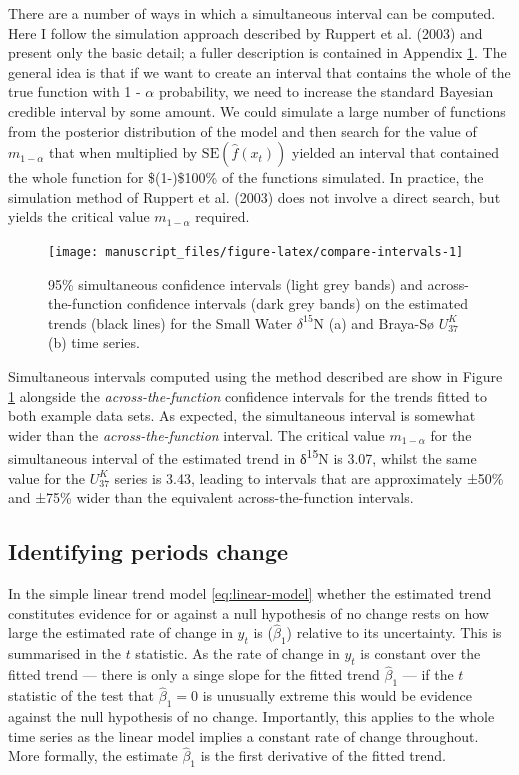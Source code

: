 \documentclass[12pt,]{article}
\newcommand{\uk}{\ensuremath{\mathit{U}^{\mathit{K}}_{\mathup{37}}}}
\begin{document}
There are a number of ways in which a simultaneous interval can be
computed. Here I follow the simulation approach described by Ruppert et
al. (2003) and present only the basic detail; a fuller description is
contained in Appendix \protect\hyperlink{appendix}{1}. The general idea
is that if we want to create an interval that contains the whole of the
true function with 1 - \(\alpha\) probability, we need to increase the
standard Bayesian credible interval by some amount. We could simulate a
large number of functions from the posterior distribution of the model
and then search for the value of \(m_{1-\alpha}\) that when multiplied
by \(\text{SE}(\hat{f}(x_t))\) yielded an interval that contained the
whole function for \$(1-\alpha)\$100\% of the functions simulated. In
practice, the simulation method of Ruppert et al. (2003) does not
involve a direct search, but yields the critical value \(m_{1-\alpha}\)
required.

\begin{figure}

{\centering \texttt{[image: manuscript\_files/figure-latex/compare-intervals-1]} 

}

\caption{95\% simultaneous confidence intervals (light grey bands) and across-the-function confidence intervals (dark grey bands) on the estimated trends (black lines) for the Small Water $\delta^{15}\text{N}$ (a) and Braya-Sø \uk{} (b) time series.}\label{fig:compare-intervals}
\end{figure}

Simultaneous intervals computed using the method described are show in
Figure \ref{fig:compare-intervals} alongside the
\emph{across-the-function} confidence intervals for the trends fitted to
both example data sets. As expected, the simultaneous interval is
somewhat wider than the \emph{across-the-function} interval. The
critical value \(m_{1-\alpha}\) for the simultaneous interval of the
estimated trend in δ\textsuperscript{15}N is 3.07, whilst the same value
for the \uk{} series is 3.43, leading to intervals that are
approximately ±50\% and ±75\% wider than the equivalent
across-the-function intervals.

\subsection{Identifying periods
change}\label{identifying-periods-change}

In the simple linear trend model \eqref{eq:linear-model} whether the
estimated trend constitutes evidence for or against a null hypothesis of
no change rests on how large the estimated rate of change in \(y_t\) is
(\(\hat{\beta}_1\)) relative to its uncertainty. This is summarised in
the \(t\) statistic. As the rate of change in \(y_t\) is constant over
the fitted trend --- there is only a singe slope for the fitted trend
\(\hat{\beta}_1\) --- if the \(t\) statistic of the test that
\(\hat{\beta}_1 = 0\) is unusually extreme this would be evidence
against the null hypothesis of no change. Importantly, this applies to
the whole time series as the linear model implies a constant rate of
change throughout. More formally, the estimate \(\hat{\beta}_1\) is the
first derivative of the fitted trend.
\end{document}
